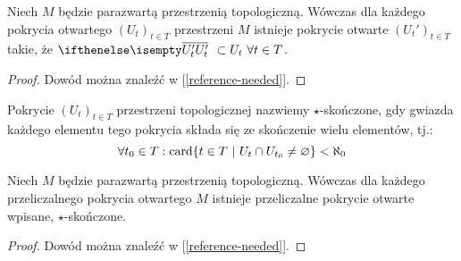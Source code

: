 \begin{lem} \label{lem:cl-refinement}
  Niech $M$ będzie parazwartą przestrzenią topologiczną. Wówczas dla każdego pokrycia otwartego $(U_t)_{t \in T}$ przestrzeni $M$ istnieje pokrycie otwarte $(U_t')_{t \in T}$ takie, że $\cl{U_t'}\ \subset U_t\ \forall t \in T$.
  \begin{proof}
    Dowód można znaleźć w [\ref{reference-needed}].
  \end{proof}
\end{lem}

\begin{df}
  Pokrycie $(U_t)_{t \in T}$ przestrzeni topologicznej nazwiemy $\star$-skończone, gdy gwiazda każdego elementu tego pokrycia składa się ze skończenie wielu elementów, tj.:
  \[
    \forall t_0 \in T: \operatorname{card}\{t \in T\ |\ U_t \cap U_{t_0} \neq \varnothing\} < \aleph_0
  \]

\end{df}


\begin{lem} \label{lem:star-finite}
  Niech $M$ będzie parazwartą przestrzenią topologiczną. Wówczas dla każdego przeliczalnego pokrycia otwartego $M$ istnieje przeliczalne pokrycie otwarte wpisane, $\star$-skończone.
  \begin{proof}
    Dowód można znaleźć w [\ref{reference-needed}].
  \end{proof}
\end{lem}
